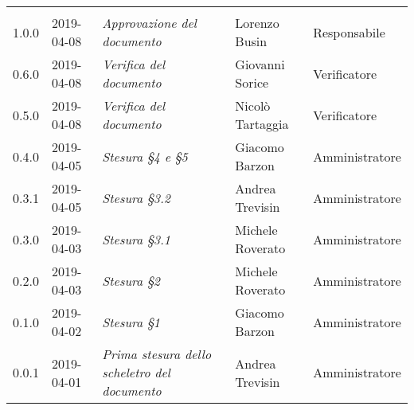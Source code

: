 \newpage 
\section*{}
\begin{longtable}{C{2cm}|C{2.5cm}|C{4.5cm}|C{2.5cm}|C{3cm}}
	
	 &  &  &  &   \\
	\endhead
	
	1.0.0 & 2019-04-08 &  \emph{Approvazione del documento} &  Lorenzo Busin & Responsabile\\
	\hline
	
	0.6.0 & 2019-04-08 & \emph{Verifica del documento} & Giovanni Sorice & Verificatore \\
	\hline
	
	0.5.0 & 2019-04-08 & \emph{Verifica del documento} & Nicolò Tartaggia & Verificatore \\
	\hline
	
	0.4.0 & 2019-04-05 & \emph{Stesura §4 e §5} & Giacomo Barzon & Amministratore \\
	\hline
	
	0.3.1 & 2019-04-05 & \emph{Stesura §3.2} & Andrea Trevisin & Amministratore \\
	\hline
	
	0.3.0 & 2019-04-03 & \emph{Stesura §3.1} & Michele Roverato & Amministratore \\
	\hline
	
	0.2.0 & 2019-04-03 & \emph{Stesura §2} & Michele Roverato & Amministratore \\
	\hline
	
	0.1.0 & 2019-04-02 & \emph{Stesura §1} & Giacomo Barzon & Amministratore \\
	\hline
	
	0.0.1 & 2019-04-01 & \emph{Prima stesura dello scheletro del documento} & Andrea Trevisin & Amministratore \\
	
\end{longtable}



\clearpage